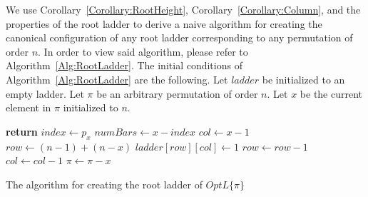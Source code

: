 We use Corollary~\ref{Corollary:RootHeight}, Corollary~\ref{Corollary:Column}, and the properties of the root 
ladder to derive a naive algorithm for creating the canonical configuration of any root ladder corresponding to 
any permutation of order $n$.
In order to view said algorithm, please refer to Algorithm~\ref{Alg:RootLadder}. 
The initial conditions of Algorithm~\ref{Alg:RootLadder} are the 
following. Let $ladder$ be initialized to an empty ladder. Let $\pi$ be an arbitrary permutation 
of order $n$. Let $x$ be the current element in $\pi$ initialized to $n$.
\begin{algorithm}[ht]
	\begin{algorithmic}[1]
				\State \textbf{return}
            \EndIf
            \State $index \gets p_{x}$
            \State $numBars \gets x-index$
            \State $col \gets x-1$
            \State $row \gets (n-1)+(n-x)$
                    \State $ladder[row][col] \gets 1$
                    \State $row \gets row-1$
                    \State $col \gets col-1$
            \EndFor
            \State $\pi \gets \pi - x$
        \EndFunction

	\end{algorithmic}
	\caption{The algorithm for creating the root ladder of $OptL\{\pi\}$}
	\label{Alg:RootLadder}
\end{algorithm}

